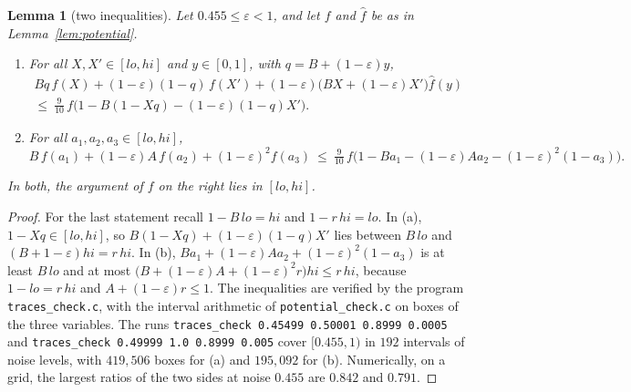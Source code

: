 \documentclass[11pt]{amsart}
\newtheorem{lemma}[theorem]{Lemma}
\theoremstyle{definition}
\theoremstyle{remark}
\newcommand{\eps}{\varepsilon}
\begin{document}
\begin{lemma}[two inequalities]\label{lem:traceineq}
Let $0.455\le\eps<1$, and let $f$ and $\hat f$ be as in Lemma~\ref{lem:potential}.
\begin{enumerate}[label=(\alph*),leftmargin=2.4em]
\item For all $X,X'\in[lo,hi]$ and $y\in[0,1]$, with $q=B+(1-\eps)y$,
\begin{multline*}
Bq\,f(X)+(1-\eps)(1-q)\,f(X')+(1-\eps)\bigl(BX+(1-\eps)X'\bigr)\hat f(y)\\
\le\ \tfrac9{10}\,f\bigl(1-B(1-Xq)-(1-\eps)(1-q)X'\bigr).
\end{multline*}
\item For all $a_1,a_2,a_3\in[lo,hi]$,
\[
B\,f(a_1)+(1-\eps)A\,f(a_2)+(1-\eps)^2f(a_3)\ \le\ \tfrac9{10}\,f\bigl(1-Ba_1-(1-\eps)Aa_2-(1-\eps)^2(1-a_3)\bigr).
\]
\end{enumerate}
In both, the argument of $f$ on the right lies in $[lo,hi]$.
\end{lemma}

\begin{proof}
For the last statement recall $1-B\,lo=hi$ and $1-r\,hi=lo$. In (a), $1-Xq\in[lo,hi]$, so
$B(1-Xq)+(1-\eps)(1-q)X'$ lies between $B\,lo$ and $(B+1-\eps)hi=r\,hi$. In (b),
$Ba_1+(1-\eps)Aa_2+(1-\eps)^2(1-a_3)$ is at least $B\,lo$ and at most
$\bigl(B+(1-\eps)A+(1-\eps)^2r\bigr)hi\le r\,hi$, because $1-lo=r\,hi$ and
$A+(1-\eps)r\le1$. The inequalities are verified by the program \texttt{traces\_check.c}, with
the interval arithmetic of \texttt{potential\_check.c} on boxes of the three variables. The runs
\texttt{traces\_check 0.45499 0.50001 0.8999 0.0005} and
\texttt{traces\_check 0.49999 1.0 0.8999 0.005} cover $[0.455,1)$ in $192$ intervals of noise
levels, with $419{,}506$ boxes for (a) and $195{,}092$ for (b). Numerically, on a grid, the
largest ratios of the two sides at noise $0.455$ are $0.842$ and $0.791$.
\end{proof}
\end{document}
